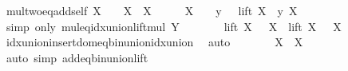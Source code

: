 \begin{isabellebody}
\endisatagproof
{\isafoldproof}%
%
\isadelimproof
\isanewline
%
\endisadelimproof
\isanewline
{}\isamarkupfalse%
\ mul{\isacharunderscore}{\kern0pt}two{\isacharunderscore}{\kern0pt}eq{\isacharunderscore}{\kern0pt}add{\isacharunderscore}{\kern0pt}self{\isacharcolon}{\kern0pt}\ {\isachardoublequoteopen}X\ {\isacharasterisk}{\kern0pt}\ {}\ {\isacharequal}{\kern0pt}\ X\ {\isacharplus}{\kern0pt}\ X{\isachardoublequoteclose}\isanewline
%
\isadelimproof
%
\endisadelimproof
%
\isatagproof
{}\isamarkupfalse%
\ {\isacharminus}{\kern0pt}\isanewline
\ \ \isamarkupfalse%
\ {\isachardoublequoteopen}X\ {\isacharasterisk}{\kern0pt}\ {}\ {\isacharequal}{\kern0pt}\ {\isacharparenleft}{\kern0pt}{\isasymUnion}y\ {\isasymin}\ {}{\isachardot}{\kern0pt}\ lift\ {\isacharparenleft}{\kern0pt}X\ {\isacharasterisk}{\kern0pt}\ y{\isacharparenright}{\kern0pt}\ X{\isacharparenright}{\kern0pt}{\isachardoublequoteclose}\ \isamarkupfalse%
\ {\isacharparenleft}{\kern0pt}simp\ only{\isacharcolon}{\kern0pt}\ mul{\isacharunderscore}{\kern0pt}eq{\isacharunderscore}{\kern0pt}idx{\isacharunderscore}{\kern0pt}union{\isacharunderscore}{\kern0pt}lift{\isacharunderscore}{\kern0pt}mul{\isacharbrackleft}{\kern0pt}\ {\isacharquery}{\kern0pt}Y{\isacharequal}{\kern0pt}{}{\isacharbrackright}{\kern0pt}{\isacharparenright}{\kern0pt}\isanewline
\ \ \isamarkupfalse%
\ \isamarkupfalse%
\ {\isachardoublequoteopen}{\isachardot}{\kern0pt}{\isachardot}{\kern0pt}{\isachardot}{\kern0pt}\ {\isacharequal}{\kern0pt}\ lift\ {\isacharparenleft}{\kern0pt}X\ {\isacharasterisk}{\kern0pt}\ {}{\isacharparenright}{\kern0pt}\ X\ {\isasymunion}\ lift\ {\isacharparenleft}{\kern0pt}X\ {\isacharasterisk}{\kern0pt}\ {}{\isacharparenright}{\kern0pt}\ X{\isachardoublequoteclose}\isanewline
\ \ \ \ \isamarkupfalse%
\ idx{\isacharunderscore}{\kern0pt}union{\isacharunderscore}{\kern0pt}insert{\isacharunderscore}{\kern0pt}dom{\isacharunderscore}{\kern0pt}eq{\isacharunderscore}{\kern0pt}bin{\isacharunderscore}{\kern0pt}union{\isacharunderscore}{\kern0pt}idx{\isacharunderscore}{\kern0pt}union\ \isamarkupfalse%
\ auto\isanewline
\ \ \isamarkupfalse%
\ \isamarkupfalse%
\ {\isachardoublequoteopen}{\isachardot}{\kern0pt}{\isachardot}{\kern0pt}{\isachardot}{\kern0pt}\ {\isacharequal}{\kern0pt}\ X\ {\isacharplus}{\kern0pt}\ X{\isachardoublequoteclose}\ \isamarkupfalse%
\ {\isacharparenleft}{\kern0pt}auto\ simp{\isacharcolon}{\kern0pt}\ add{\isacharunderscore}{\kern0pt}eq{\isacharunderscore}{\kern0pt}bin{\isacharunderscore}{\kern0pt}union{\isacharunderscore}{\kern0pt}lift{\isacharparenright}{\kern0pt}\isanewline

\end{isabellebody}
